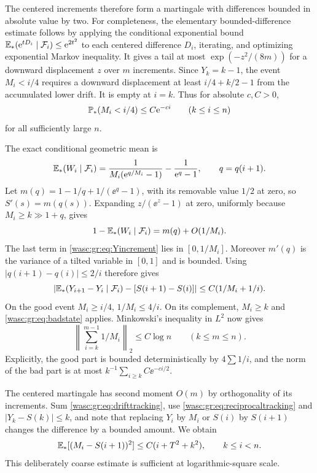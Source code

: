 \documentclass[11pt,a4paper]{article}
\theoremstyle{remark}\newtheorem{remark}[theorem]{Remark}
\numberwithin{equation}{section}
\begin{document}
The centered increments therefore form a martingale with differences bounded in absolute value by two. For completeness, the elementary bounded-difference estimate follows by applying the conditional exponential bound $\mathbb E_*(\mathrm e^{tD_i}\mid\mathcal F_i)\le\mathrm e^{2t^2}$ to each centered difference $D_i$, iterating, and optimizing exponential Markov inequality. It gives a tail at most $\exp(-z^2/(8m))$ for a downward displacement $z$ over $m$ increments. Since $Y_k=k-1$, the event $M_i<i/4$ requires a downward displacement at least $i/4+k/2-1$ from the accumulated lower drift. It is empty at $i=k$. Thus for absolute $c,C>0$,
\begin{equation}\label{wasc:gr:eq:badstate}
\mathbb P_*(M_i<i/4)\le C\mathrm e^{-ci}\qquad(k\le i\le n)
\end{equation}
for all sufficiently large $n$.

The exact conditional geometric mean is
\begin{equation}\label{wasc:gr:eq:Wmean}
\mathbb E_*(W_i\mid\mathcal F_i)=
\frac1{M_i(\mathrm e^{q/M_i}-1)}-\frac1{\mathrm e^q-1},\qquad q=q(i+1).
\end{equation}
Let $m(q)=1-1/q+1/(\ee^q-1)$, with its removable value $1/2$ at zero, so $S'(s)=m(q(s))$. Expanding $z/(\ee^z-1)$ at zero, uniformly because $M_i\ge k\gg1+q$, gives
\[
1-\mathbb E_*(W_i\mid\mathcal F_i)=m(q)+O(1/M_i).
\]
The last term in \eqref{wasc:gr:eq:Yincrement} lies in $[0,1/M_i]$. Moreover $m'(q)$ is the variance of a tilted variable in $[0,1]$ and is bounded. Using $|q(i+1)-q(i)|\le2/i$ therefore gives
\begin{equation}\label{wasc:gr:eq:drifttracking}
\left|\mathbb E_*(Y_{i+1}-Y_i\mid\mathcal F_i)-[S(i+1)-S(i)]\right|
\le C(1/M_i+1/i).
\end{equation}
On the good event $M_i\ge i/4$, $1/M_i\le4/i$. On its complement, $M_i\ge k$ and \eqref{wasc:gr:eq:badstate} applies. Minkowski's inequality in $L^2$ now gives
\begin{equation}\label{wasc:gr:eq:reciprocaltracking}
\left\|\sum_{i=k}^{m-1}1/M_i\right\|_2\le C\log n\qquad(k\le m\le n).
\end{equation}
Explicitly, the good part is bounded deterministically by $4\sum1/i$, and the norm of the bad part is at most $k^{-1}\sum_{i\ge k}C\ee^{-ci/2}$.

The centered martingale has second moment $O(m)$ by orthogonality of its increments. Sum \eqref{wasc:gr:eq:drifttracking}, use \eqref{wasc:gr:eq:reciprocaltracking} and $|Y_k-S(k)|\le k$, and note that replacing $Y_i$ by $M_i$ or $S(i)$ by $S(i+1)$ changes the difference by a bounded amount. We obtain
\begin{equation}\label{wasc:gr:eq:quadratictracking}
\mathbb E_*[(M_i-S(i+1))^2]\le C(i+T^2+k^2),\qquad k\le i<n.
\end{equation}
This deliberately coarse estimate is sufficient at logarithmic-square scale.
\end{document}
